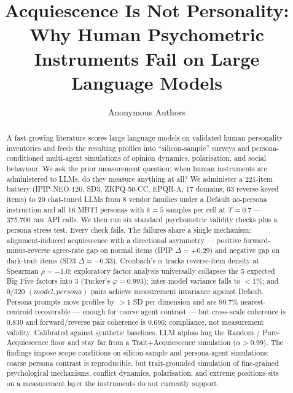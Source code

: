 \documentclass[11pt]{article}
\title{Acquiescence Is Not Personality: \\ Why Human Psychometric Instruments Fail on Large Language Models}
\author{Anonymous Authors}
\begin{document}
\maketitle

\begin{abstract}
A fast-growing literature scores large language models on validated human personality inventories and feeds the resulting profiles into ``silicon-sample'' surveys and persona-conditioned multi-agent simulations of opinion dynamics, polarisation, and social behaviour. We ask the prior measurement question: when human instruments are administered to LLMs, do they measure anything at all? We administer a 221-item battery (IPIP-NEO-120, SD3, ZKPQ-50-CC, EPQR-A; 17 domains; 63 reverse-keyed items) to 20 chat-tuned LLMs from 8 vendor families under a Default no-persona instruction and all 16 MBTI personas with $k{=}5$ samples per cell at $T{=}0.7$ --- 375{,}700 raw API calls. We then run six standard psychometric validity checks plus a persona stress test. Every check fails. The failures share a single mechanism: alignment-induced acquiescence with a directional asymmetry --- positive forward-minus-reverse agree-rate gap on normal items (IPIP $\Delta{=}{+}0.29$) and negative gap on dark-trait items (SD3 $\Delta{=}{-}0.33$). Cronbach's $\alpha$ tracks reverse-item density at Spearman $\rho{=}{-}1.0$; exploratory factor analysis universally collapses the 5 expected Big Five factors into 3 (Tucker's $\varphi{=}0.993$); inter-model variance falls to ${<}1\%$; and $0/320$ $(model, persona)$ pairs achieve measurement invariance against Default. Persona prompts move profiles by ${>}1$ SD per dimension and are $99.7\%$ nearest-centroid recoverable --- enough for \emph{coarse} agent contrast --- but cross-scale coherence is $0.839$ and forward/reverse pair coherence is $0.696$: compliance, not measurement validity. Calibrated against synthetic baselines, LLM alphas hug the Random / Pure-Acquiescence floor and stay far from a Trait+Acquiescence simulation ($\alpha{>}0.99$). The findings impose scope conditions on silicon-sample and persona-agent simulations: coarse persona contrast is reproducible, but trait-grounded simulation of fine-grained psychological mechanisms, conflict dynamics, polarisation, and extreme positions sits on a measurement layer the instruments do not currently support.
\end{abstract}

\end{document}

